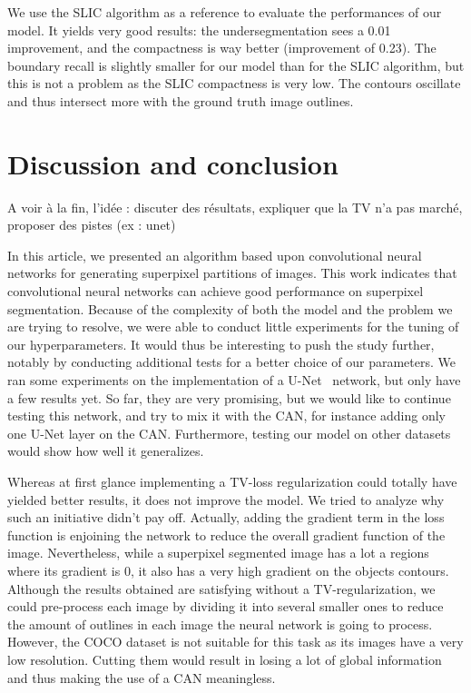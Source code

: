 \documentclass{article}
\begin{document}
        \par
        We use the SLIC algorithm as a reference to evaluate the performances of our model. It yields very good results: the undersegmentation sees a 0.01 improvement, and the compactness is way better (improvement of 0.23). The boundary recall is slightly smaller for our model than for the SLIC algorithm, but this is not a problem as the SLIC compactness is very low. The contours oscillate and thus intersect more with the ground truth image outlines.




\section{Discussion and conclusion}
    A voir à la fin, l’idée : discuter des résultats, expliquer que la TV n’a pas marché, proposer des pistes (ex : unet)

    In this article, we presented an algorithm based upon convolutional neural networks for generating superpixel partitions of images. This work indicates that convolutional neural networks can achieve good performance on superpixel segmentation. Because of the complexity of both the model and the problem we are trying to resolve, we were able to conduct little experiments for the tuning of our hyperparameters. It would thus be interesting to push the study further, notably by conducting additional tests for a better choice of our parameters. We ran some experiments on the implementation of a U-Net~\cite{unet2015} network, but only have a few results yet. So far, they are very promising, but we would like to continue testing this network, and try to mix it with the CAN, for instance adding only one U-Net layer on the CAN. Furthermore, testing our model on other datasets would show how well it generalizes.




    Whereas at first glance implementing a TV-loss regularization could totally have yielded better results, it does not improve the model. We tried to analyze why such an initiative didn't pay off. Actually, adding the gradient term in the loss function is enjoining the network to reduce the overall gradient function of the image. Nevertheless, while a superpixel segmented image has a lot a regions where its gradient is 0, it also has a very high gradient on the objects contours.
    Although the results obtained are satisfying without a TV-regularization, we could pre-process each image by dividing it into several smaller ones to reduce the amount of outlines in each image the neural network is going to process. However, the COCO dataset is not suitable for this task as its images have a very low resolution. Cutting them would result in losing a lot of global information and thus making the use of a CAN meaningless.
\end{document}
